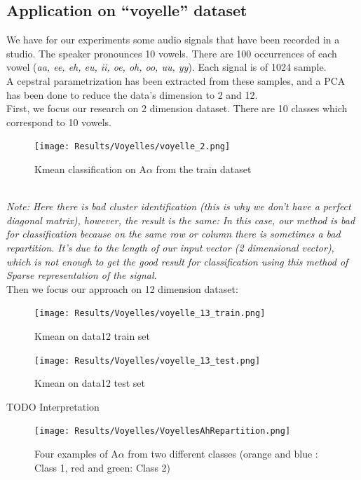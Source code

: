 \documentclass[a4paper,10pt]{article}
\begin{document}
\subsection{Application on ``voyelle'' dataset }
We have for our experiments some audio signals that have been recorded in a studio. The speaker pronounces 10 vowels. There are 100 occurrences of each vowel (\textit{aa, ee, eh, eu, ii, oe, oh, oo, uu, yy}). Each signal is of 1024 sample.\\
A cepstral parametrization has been extracted from these samples, and a PCA has been done to reduce the data's dimension to  2 and 12. \vspace{0.5cm} \\
First, we focus our research on 2 dimension dataset. There are 10 classes which correspond to 10 vowels.\newline
\begin{figure}[h]
 \centering
 \texttt{[image: Results/Voyelles/voyelle\_2.png]}
 \caption{Kmean classification on A$\alpha$ from the train dataset}
\end{figure}
 \\
\textit{Note: Here there is bad cluster identification (this is why we don't have a perfect diagonal matrix), however, the result is the same: In this case, our method is bad for classification because on the same row or column there is sometimes a bad repartition. It's due to the length of our input vector (2 dimensional vector), which is not enough to get the good result for classification using this method of Sparse representation of the signal.} \vspace{0.5cm}
\\ Then we focus our approach on 12 dimension dataset:
\begin{figure}[h]
 \centering
 \texttt{[image: Results/Voyelles/voyelle\_13\_train.png]}
 \caption{Kmean on data12 train set}
\end{figure}
\begin{figure}[h]
 \centering
 \texttt{[image: Results/Voyelles/voyelle\_13\_test.png]}
 \caption{Kmean on data12 test set}
\end{figure}
 
TODO Interpretation
\begin{figure}[h]
 \centering
 \texttt{[image: Results/Voyelles/VoyellesAhRepartition.png]}
 \caption{ Four examples of A$\alpha$ from two different classes (orange and blue : Class 1, red and green: Class 2)}
\end{figure}
\end{document}
